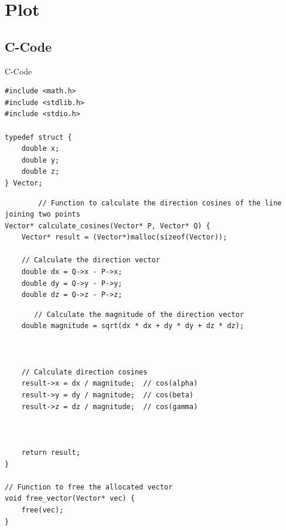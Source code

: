 \documentclass{beamer}
\theoremstyle{remark}
\begin{document}
\section{Plot}
\subsection{C-Code}
\begin{frame}[fragile]{C-Code}
    \begin{verbatim}
#include <math.h>
#include <stdlib.h>
#include <stdio.h>

typedef struct {
    double x;
    double y;
    double z;
} Vector;
\end{verbatim}
\end{frame}
 \begin{frame}[fragile]    \begin{verbatim}
	    // Function to calculate the direction cosines of the line joining two points
Vector* calculate_cosines(Vector* P, Vector* Q) {
    Vector* result = (Vector*)malloc(sizeof(Vector));

    // Calculate the direction vector
    double dx = Q->x - P->x;
    double dy = Q->y - P->y;
    double dz = Q->z - P->z;

    \end{verbatim}
\end{frame}
\begin{frame}[fragile]
	\begin{verbatim}
	   // Calculate the magnitude of the direction vector
    double magnitude = sqrt(dx * dx + dy * dy + dz * dz);
   

    
    // Calculate direction cosines
    result->x = dx / magnitude;  // cos(alpha)
    result->y = dy / magnitude;  // cos(beta)
    result->z = dz / magnitude;  // cos(gamma)

   

    return result;
}

// Function to free the allocated vector
void free_vector(Vector* vec) {
    free(vec);
}


    \end{verbatim}
\end{frame}
\end{document}
